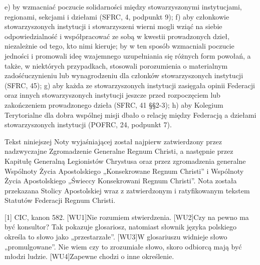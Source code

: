 ﻿\documentclass{book}
\begin{document}
e)         by wzmacniać poczucie solidarności między stowarzyszonymi instytucjami, regionami, sekcjami i dziełami (SFRC, 4, podpunkt 9);
f)         aby członkowie stowarzyszonych instytucji i stowarzyszeni wierni mogli wziąć na siebie odpowiedzialność i współpracować ze sobą w kwestii prowadzonych dzieł, niezależnie od tego, kto nimi kieruje; by w ten sposób wzmacniali poczucie jedności i promowali ideę wzajemnego uzupełniania się różnych form powołań, a także, w niektórych przypadkach, stosowali porozumienia o materialnym zadośćuczynieniu lub wynagrodzeniu dla członków stowarzyszonych instytucji (SFRC, 45);
g)        aby każda ze stowarzyszonych instytucji zasięgała opinii Federacji oraz innych stowarzyszonych instytucji jeszcze przed rozpoczęciem lub zakończeniem prowadzonego dzieła (SFRC, 41 \S{}\S{}2-3);
h)        aby Kolegium Terytorialne dla dobra wspólnej misji dbało o relację między Federacją a dziełami stowarzyszonych instytucji (POFRC, 24, podpunkt 7).
 
Tekst niniejszej Noty wyjaśniającej został najpierw zatwierdzony przez nadzwyczajne Zgromadzenie Generalne Regnum Christi, a następnie przez Kapitułę Generalną Legionistów Chrystusa oraz przez zgromadzenia generalne Wspólnoty Życia Apostolskiego „Konsekrowane Regnum Christi” i Wspólnoty Życia Apostolskiego „Świeccy Konsekrowani Regnum Christi”. Nota została przekazana Stolicy Apostolskiej wraz z zatwierdzonym i ratyfikowanym tekstem Statutów Federacji Regnum Christi.


[1] CIC, kanon 582.
 [WU1]Nie rozumiem stwierdzenia.
 [WU2]Czy  na pewno ma być konsultor? Tak pokazuje glosariosz, natomiast słownik języka polskiego określa to słowo jako „przestarzałe”.
 [WU3]W glosariuszu widnieje słowo „promulgowane”. Nie wiem czy to zrozumiałe słowo, skoro odbiorcą mają być młodzi ludzie.
 [WU4]Zapewne chodzi o inne określenie.
\end{document}
